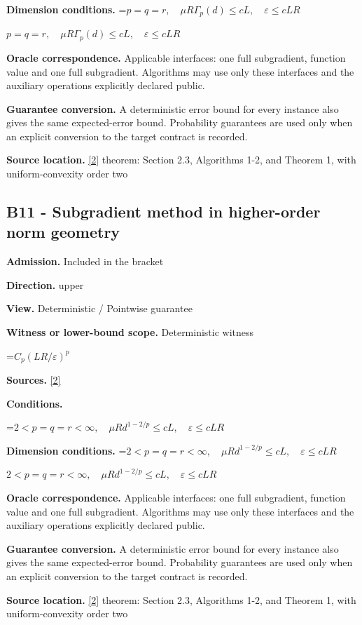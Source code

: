 \documentclass[10pt,a4paper]{article}
\newcommand{\AtlasMath}[1]{\par\begingroup\centering\setbox0=\hbox{$\displaystyle #1$}\ifdim\wd0>1.4\linewidth\typeout{ATLAS WIDE FORMULA: \the\wd0}\fi\ifdim\wd0>\linewidth\resizebox{\linewidth}{!}{\box0}\else\box0\fi\par\endgroup}
\newcommand{\AtlasInlineMath}[1]{\begingroup\setbox0=\hbox{$#1$}\ifdim\wd0>.4\linewidth\endgroup\AtlasMath{#1}\else\endgroup$#1$\fi}
\begin{document}
\textbf{Dimension conditions.} \AtlasInlineMath{p=q=r,\quad\mu R\Gamma_p(d)\le cL,\quad\varepsilon\le cLR}

\textbf{Oracle correspondence.} Applicable interfaces: one full subgradient, function value and one full subgradient. Algorithms may use only these interfaces and the auxiliary operations explicitly declared public.

\textbf{Guarantee conversion.} A deterministic error bound for every instance also gives the same expected-error bound. Probability guarantees are used only when an explicit conversion to the target contract is recorded.

\textbf{Source location.} \href{https://arxiv.org/pdf/1401.1792}{[2]} theorem: Section 2.3, Algorithms 1-2, and Theorem 1, with uniform-convexity order two

\subsection{B11 - Subgradient method in higher-order norm geometry}
\textbf{Admission.} Included in the bracket

\textbf{Direction.} upper

\textbf{View.} Deterministic / Pointwise guarantee

\textbf{Witness or lower-bound scope.} Deterministic witness

\AtlasMath{C_p(LR/\varepsilon)^p}
\textbf{Sources.} \href{https://arxiv.org/pdf/1401.1792}{[2]}

\textbf{Conditions.} 
\AtlasMath{2<p=q=r<\infty,\quad\mu R d^{1-2/p}\le cL,\quad\varepsilon\le cLR}


\textbf{Dimension conditions.} \AtlasInlineMath{2<p=q=r<\infty,\quad\mu R d^{1-2/p}\le cL,\quad\varepsilon\le cLR}

\textbf{Oracle correspondence.} Applicable interfaces: one full subgradient, function value and one full subgradient. Algorithms may use only these interfaces and the auxiliary operations explicitly declared public.

\textbf{Guarantee conversion.} A deterministic error bound for every instance also gives the same expected-error bound. Probability guarantees are used only when an explicit conversion to the target contract is recorded.

\textbf{Source location.} \href{https://arxiv.org/pdf/1401.1792}{[2]} theorem: Section 2.3, Algorithms 1-2, and Theorem 1, with uniform-convexity order two
\end{document}
